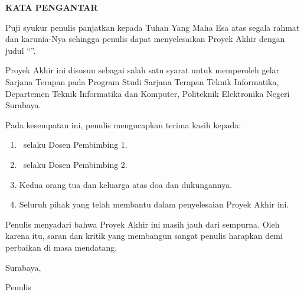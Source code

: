 \clearpage
\thispagestyle{plain}
{}

\begin{center}
{\fontsize{12}{14}\selectfont\bfseries KATA PENGANTAR}
\end{center}

\vspace{0.3cm}


Puji syukur penulis panjatkan kepada Tuhan Yang Maha Esa atas segala rahmat dan karunia-Nya sehingga penulis dapat menyelesaikan Proyek Akhir dengan judul ``\JudulPA''.

Proyek Akhir ini disusun sebagai salah satu syarat untuk memperoleh gelar Sarjana Terapan pada Program Studi Sarjana Terapan Teknik Informatika, Departemen Teknik Informatika dan Komputer, Politeknik Elektronika Negeri Surabaya.

Pada kesempatan ini, penulis mengucapkan terima kasih kepada:
\begin{enumerate}
  \item \PembimbingSatu\ selaku Dosen Pembimbing 1.
  \item \PembimbingDua\ selaku Dosen Pembimbing 2.
  \item Kedua orang tua dan keluarga atas doa dan dukungannya.
  \item Seluruh pihak yang telah membantu dalam penyelesaian Proyek Akhir ini.
\end{enumerate}

Penulis menyadari bahwa Proyek Akhir ini masih jauh dari sempurna. Oleh karena itu, saran dan kritik yang membangun sangat penulis harapkan demi perbaikan di masa mendatang.

\vspace{1cm}

\noindent
\hfill Surabaya, \Tahun

\vspace{1cm}

\noindent
\hfill Penulis

\clearpage
